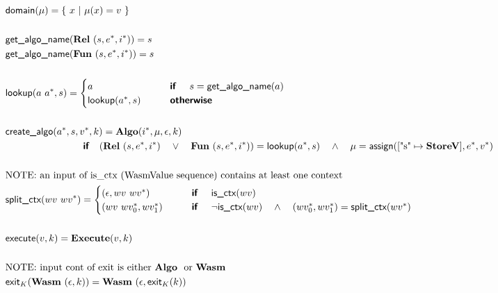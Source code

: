 \begin{align*}
%
\newline \\
  &\domain(\mu) = \{ ~ x ~ | ~ \mu(x) = v ~ \} \\
%
\newline \\
  &\getalgoname(\rel ~ (s, \seq e, \seq i)) = s \\
  &\getalgoname(\fun ~ (s, \seq e, \seq i)) = s \\
%
\newline \\
  &\lookup(a ~ \seq{a}, s) =
    \begin{cases}
      a &\quad\quad \premise{if}\quad ~ s = \getalgoname(a) \\
      \lookup(\seq{a}, s) &\quad\quad \premise{otherwise}
    \end{cases}
  \\
%
\newline \\
  &\createalgo(\seq a, s, \seq v, k) =
  \algo(\seq i, \mu, \epsilon, k) \\
  &\qquad\qquad\qquad\qquad\premise{if}\quad
  (\rel ~ (s, \seq e, \seq i) \quad\lor\quad \fun ~ (s, \seq e, \seq i)) = \lookup(\seq a, s)
  \quad\land\quad
  \mu = \assign([\text{"s"} \mapsto \storev], \seq e, \seq v) \\
%
\newline \\
&\text{NOTE: an input of is\_ctx (WasmValue sequence) contains at least one context} \\
  &\splitctx(wv ~ \seq{wv}) =
    \begin{cases}
      (\epsilon, wv ~ \seq{wv}) &\quad\quad \premise{if}\quad ~ \isctx(wv) \\
      (wv ~ \seq{wv_0}, \seq{wv_1}) &\quad\quad \premise{if}\quad ~ \neg\isctx(wv) \quad\land\quad (\seq{wv_0}, \seq{wv_1}) = \splitctx(\seq{wv})
    \end{cases}
  \\
%
\newline \\
  &\execute(v, k) = \exe(v, k) \\
%
\newline \\
&\text{NOTE: input cont of exit is either \algo ~ or \wasm} \\
  &\exit_{K}(\wasm ~ (\epsilon, k)) = \wasm ~ (\epsilon, \exit_{K}(k)) \\

\end{align*}
